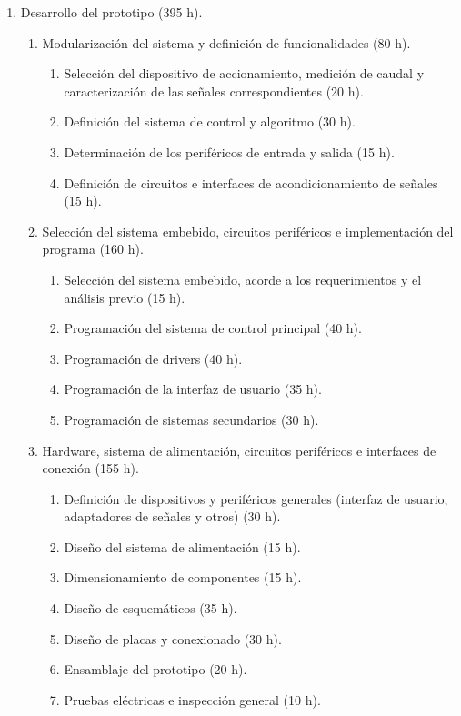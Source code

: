 \documentclass[
11pt, %
]{charter}
\begin{document}
\begin{enumerate}
\item Desarrollo del prototipo (395 h).

	\begin{enumerate}
	\item Modularización del sistema y definición de funcionalidades (80 h).
	
		\begin{enumerate}
		\item Selección del dispositivo de accionamiento, medición de caudal y caracterización de las señales correspondientes (20 h).
		\item Definición del sistema de control y algoritmo (30 h).
		\item Determinación de los periféricos de entrada y salida (15 h).
		\item Definición de circuitos e interfaces de acondicionamiento de señales (15 h).
		\end{enumerate}
		
	\item Selección del sistema embebido, circuitos periféricos e implementación del programa (160 h).
	
		\begin{enumerate}
		\item Selección del sistema embebido, acorde a los requerimientos y el análisis previo (15 h).
		\item Programación del sistema de control principal (40 h).
		\item Programación de drivers (40 h).
		\item Programación de la interfaz de usuario (35 h).
		\item Programación de sistemas secundarios (30 h).
		\end{enumerate}

		
	\item Hardware, sistema de alimentación, circuitos periféricos e interfaces de conexión (155 h).
	
		\begin{enumerate}
		\item Definición de dispositivos y periféricos generales (interfaz de usuario, adaptadores de señales y otros) (30 h).
		\item Diseño del sistema de alimentación (15 h).
		\item Dimensionamiento de componentes (15 h).
		\item Diseño de esquemáticos (35 h).
		\item Diseño de placas y conexionado (30 h).
		\item Ensamblaje del prototipo (20 h).
		\item Pruebas eléctricas e inspección general (10 h).
		\end{enumerate}		
		

\end{enumerate}
\end{enumerate}
\end{document}
